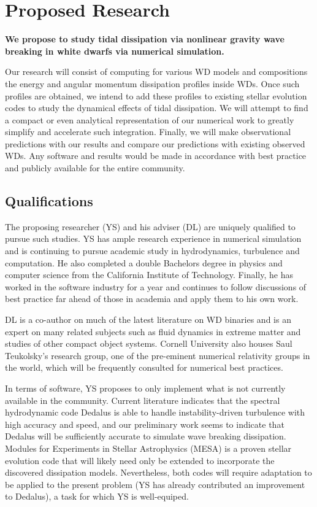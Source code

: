 \documentclass[11pt,
        usenames, %
        dvipsnames %
    ]{article}
\begin{document}
\section{Proposed Research}

\textbf{We propose to study tidal dissipation via nonlinear gravity wave
breaking in white dwarfs via numerical simulation.}

Our research will consist of computing for various WD models and compositions
the energy and angular momentum dissipation profiles inside WDs. Once such
profiles are obtained, we intend to add these profiles to existing stellar
evolution codes to study the dynamical effects of tidal dissipation. We will
attempt to find a compact or even analytical representation of our numerical
work to greatly simplify and accelerate such integration. Finally, we will make
observational predictions with our results and compare our predictions with
existing observed WDs. Any software and results would be made in accordance with
best practice and publicly available for the entire community.

\subsection{Qualifications}

The proposing researcher (YS) and his adviser (DL) are uniquely qualified to
pursue such studies. YS has ample research experience in numerical simulation
and is continuing to pursue academic study in hydrodynamics, turbulence and
computation. He also completed a double Bachelors degree in physics and computer
science from the California Institute of Technology. Finally, he has worked in
the software industry for a year and continues to follow discussions of best
practice far ahead of those in academia and apply them to his own work.

DL is a co-author on much of the latest literature on WD binaries and is an
expert on many related subjects such as fluid dynamics in extreme matter and
studies of other compact object systems. Cornell University also houses Saul
Teukolsky's research group, one of the pre-eminent numerical relativity groups
in the world, which will be frequently consulted for numerical best practices.

In terms of software, YS proposes to only implement what is not currently
available in the community. Current literature indicates that the spectral
hydrodynamic code Dedalus is able to handle instability-driven turbulence with
high accuracy and speed, and our preliminary work seems to indicate that Dedalus
will be sufficiently accurate to simulate wave breaking
dissipation\cite{dedalus}. Modules for Experiments in Stellar Astrophysics
(MESA) is a proven stellar evolution code that will likely need only be extended
to incorporate the discovered dissipation models\cite{MESA}. Nevertheless, both
codes will require adaptation to be applied to the present problem (YS has
already contributed an improvement to Dedalus), a task for which YS is
well-equiped.
\end{document}
